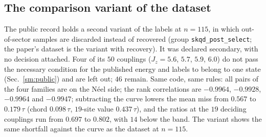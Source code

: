 \documentclass[aps,prx,onecolumn,10pt,nofootinbib,longbibliography,floatfix]{revtex4-2}
\theoremstyle{remark}
\newcommand{\Jz}{J_z}
\begin{document}
\def\SMcap{Mean and maximum miss of $m_s$ in units of $\tau$: the public label as published, corrected with the curve,
corrected with the chord, and the exact $19$-site value in place of the label. Only the top block enters the
decision.}\def\SMlab{tab:rdtest_summary}


\subsection{The comparison variant of the dataset}
The public record holds a second variant of the labels at $n=115$, in which out-of-sector samples are discarded
instead of recovered (group \texttt{skqd\_post\_select}; the paper's dataset is the variant with recovery). It was
declared secondary, with no decision attached. Four of its $50$ couplings ($\Jz=5.6$, $5.7$, $5.9$, $6.0$) do not %
pass the necessary condition for the published energy and labels to belong to one state (Sec.~\ref{sm:public}) and
are left out; $46$ remain. Same code, same rules: all pairs of the four families are on the N\'eel side; the rank %
correlations are $-0.9964$, $-0.9928$, $-0.9964$ and $-0.9947$; subtracting the curve lowers the mean miss from %
$0.567$ to $0.179\,\tau$ (chord $0.098\,\tau$, $19$-site value $0.437\,\tau$), and the ratios at the $19$ deciding %
couplings run from $0.697$ to $0.802$, with $14$ below the band. The variant shows the same shortfall against the %
curve as the dataset at $n=115$.
\end{document}
